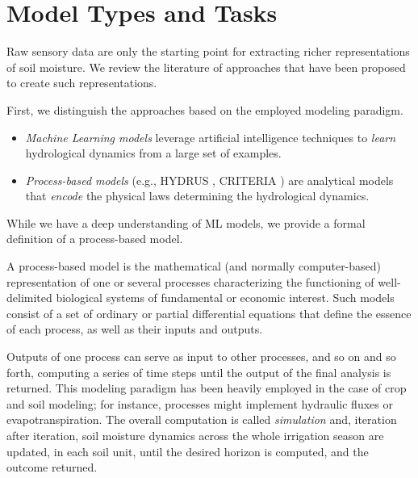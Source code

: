 \section{Model Types and Tasks}
\label{orchard-ssec:models}

Raw sensory data are only the starting point for extracting richer representations of soil moisture.
We review the literature of approaches that
have been proposed to create such representations.

First, we distinguish the approaches based on the employed modeling paradigm.
\begin{itemize}
    \item \emph{Machine Learning models} leverage artificial intelligence techniques to \textit{learn} hydrological dynamics from a large set of examples.
    \item \emph{Process-based models} (e.g., HYDRUS \cite{hydrus2008587}, CRITERIA \cite{Bittelli2011253}) are analytical models that \textit{encode} the physical laws determining the hydrological dynamics.
\end{itemize}
While we have a deep understanding of ML models, we provide a formal definition of a process-based model.

\begin{definition}
    A process-based model is the mathematical (and normally computer-based) representation of one or several processes characterizing the functioning of well-delimited biological systems of fundamental or economic interest.
    Such models consist of a set of ordinary or partial differential equations that define the essence of each process, as well as their inputs and outputs.
\end{definition}


Outputs of one process can serve as input to other processes, and so on and so forth, computing a series of time steps until the output of the final analysis is returned.
This modeling paradigm has been heavily employed in the case of crop and soil modeling; for instance, processes might implement hydraulic fluxes or evapotranspiration.
The overall computation is called \textit{simulation} and, iteration after iteration, soil moisture dynamics across the whole irrigation season are updated, in each soil unit, until the desired horizon is computed, and the outcome returned.

